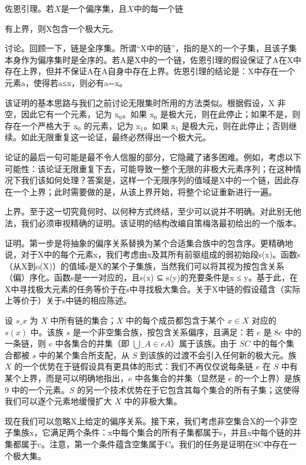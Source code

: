 \documentclass[12pt,a4paper]{ctexbook}
\theoremstyle{definition}
\theoremstyle{remark}
\begin{document}
{佐恩引理。若$X$是一个偏序集，且$X$中的每一个链

有上界，则X包含一个极大元。

讨论。回顾一下，链是全序集。所谓“X中的链”，指的是X的一个子集，且该子集本身作为偏序集时是全序的。若A是X中的一个链，佐恩引理的假设保证了A在X中存在上界，但并不保证A在A自身中存在上界。佐恩引理的结论是：X中存在一个元素a，使得若a≤x，则必有a=x。

该证明的基本思路与我们之前讨论无限集时所用的方法类似。根据假设，X 非空，因此它有一个元素，记为 x$_{0}$。如果 x$_{0}$ 是极大元，则在此停止；如果不是，则存在一个严格大于 x$_{0}$ 的元素，记为 x$_{1}$。如果 x$_{1}$ 是极大元，则在此停止；否则继续。如此无限重复这一论证，最终必然得出一个极大元。

论证的最后一句可能是最不令人信服的部分，它隐藏了诸多困难。例如，考虑以下可能性：该论证无限重复下去，可能导致一整个无限的非极大元素序列；在这种情况下我们该如何处理？答案是，这样一个无限序列的值域是X中的一个链，因此存在一个上界；此时需要做的是，从该上界开始，将整个论证重新进行一遍。

上界。至于这一切究竟何时、以何种方式终结，至少可以说并不明确。对此别无他法，我们必须审视精确的证明。该证明的结构改编自策梅洛最初给出的一个版本。

证明。第一步是将抽象的偏序关系替换为某个合适集合族中的包含序。更精确地说，对于X中的每个元素x，我们考虑由x及其所有前驱组成的弱初始段s(x)。函数s（从X到o(X)）的值域s是X的某个子集族，当然我们可以将其视为按包含关系（偏）序化。函数s是一一对应的，且s(x) ⊆ s(y)的充要条件是x ≤ y。基于此，在X中寻找极大元素的任务等价于在s中寻找极大集合。关于X中链的假设蕴含（实际上等价于）关于s中链的相应陈述。

设 \(s\_x\) 为 \(X\) 中所有链的集合；\(X\) 中的每个成员都包含于某个 \(x \in X\) 对应的 \(s(x)\) 中。该族 \(s\) 是一个非空集合族，按包含关系偏序，且满足：若 \(e\) 是 \(8c\) 中的一条链，则 \(e\) 中各集合的并集（即 \(\bigcup\_{A \in e} A\)）属于该族。由于 \(SC\) 中的每个集合都被 \(s\) 中的某个集合所支配，从 \(S\) 到该族的过渡不会引入任何新的极大元。族 \(X\) 的一个优势在于链假设具有更具体的形式：我们不再仅仅说每条链 \(e\) 在 \(S\) 中有某个上界，而是可以明确地指出，\(e\) 中各集合的并集（显然是 \(e\) 的一个上界）是族 \(9\) 中的一个元素。\(S\) 的另一个技术优势在于它包含其每个集合的所有子集；这使得我们可以逐个元素地缓慢扩大 \(X\) 中的非极大集。

现在我们可以忽略X上给定的偏序关系。接下来，我们考虑非空集合X的一个非空子集族x，它满足两个条件：x中每个集合的所有子集都属于s，并且x中每个链的并集都属于c。注意，第一个条件蕴含空集属于C。我们的任务是证明在SC中存在一个极大集。

}
\end{document}
